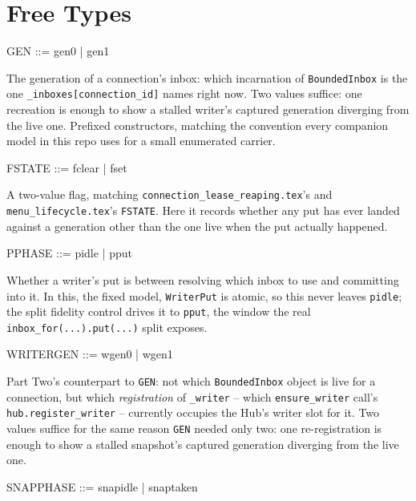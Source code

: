 \documentclass[a4paper,10pt,fleqn]{article}
\begin{document}
\section{Free Types}

\begin{zed}
  GEN ::= gen0 | gen1
\end{zed}

The generation of a connection's inbox: which incarnation of
\texttt{BoundedInbox} is the one \texttt{\_inboxes[connection\_id]} names
right now. Two values suffice: one recreation is enough to show a stalled
writer's captured generation diverging from the live one. Prefixed
constructors, matching the convention every companion model in this repo
uses for a small enumerated carrier.

\begin{zed}
  FSTATE ::= fclear | fset
\end{zed}

A two-value flag, matching \texttt{connection\_lease\_reaping.tex}'s and
\texttt{menu\_lifecycle.tex}'s \texttt{FSTATE}. Here it records whether any
put has ever landed against a generation other than the one live when the
put actually happened.

\begin{zed}
  PPHASE ::= pidle | pput
\end{zed}

Whether a writer's put is between resolving which inbox to use and
committing into it. In this, the fixed model, \texttt{WriterPut} is atomic,
so this never leaves \texttt{pidle}; the split fidelity control drives it to
\texttt{pput}, the window the real \texttt{inbox\_for(...).put(...)} split
exposes.

\begin{zed}
  WRITERGEN ::= wgen0 | wgen1
\end{zed}

Part Two's counterpart to \texttt{GEN}: not which \texttt{BoundedInbox}
object is live for a connection, but which \emph{registration} of
\texttt{\_writer} -- which \texttt{ensure\_writer} call's
\texttt{hub.register\_writer} -- currently occupies the Hub's writer slot
for it. Two values suffice for the same reason \texttt{GEN} needed only two:
one re-registration is enough to show a stalled snapshot's captured
generation diverging from the live one.

\begin{zed}
  SNAPPHASE ::= snapidle | snaptaken
\end{zed}
\end{document}
